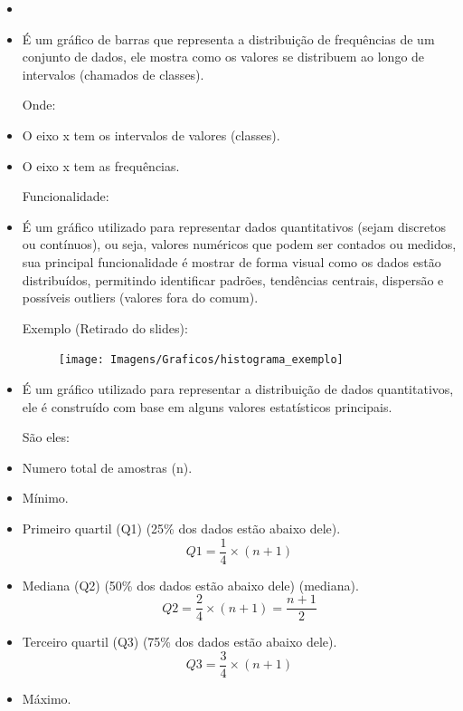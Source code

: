 \documentclass[a4paper,11pt]{article}
\begin{document}
\begin{itemize}
\item[]
    \item É um gráfico de barras que representa a distribuição de frequências de um conjunto de dados, ele mostra como os valores se distribuem ao longo de intervalos (chamados de classes).

\vspace{5mm} %

    Onde:
    \item O eixo x tem os intervalos de valores (classes).
    \item O eixo x tem as frequências.
    
\vspace{5mm} %

    Funcionalidade:
    \item É um gráfico utilizado para representar dados quantitativos (sejam discretos ou contínuos), ou seja, valores numéricos que podem ser contados ou medidos, sua principal funcionalidade é mostrar de forma visual como os dados estão distribuídos, permitindo identificar padrões, tendências centrais, dispersão e possíveis outliers (valores fora do comum).

\vspace{5mm} %

    Exemplo (Retirado do slides):
    \begin{figure}[!h] 
        \centering
        \texttt{[image: Imagens/Graficos/histograma\_exemplo]} 
    \end{figure}
    
    \item É um gráfico utilizado para representar a distribuição de dados quantitativos, ele é construído com base em alguns valores estatísticos principais.

\vspace{5mm} %

    São eles:
    \item Numero total de amostras (n).
    \item Mínimo.
    \item Primeiro quartil (Q1) (25\% dos dados estão abaixo dele).
        \[Q1 = \frac{1}{4} \times (n + 1) \]
    \item Mediana (Q2) (50\% dos dados estão abaixo dele) (mediana).
        \[Q2 = \frac{2}{4} \times (n + 1) = \frac{n + 1}{2}\]
    \item Terceiro quartil (Q3) (75\% dos dados estão abaixo dele).
        \[Q3 = \frac{3}{4} \times (n + 1)\]
    \item Máximo.


\end{itemize}
\end{document}
